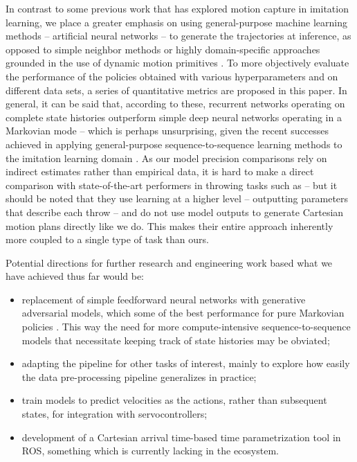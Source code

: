 \documentclass{article}
\begin{document}
In contrast to some previous work that has explored motion capture in imitation learning, we place a greater emphasis on using general-purpose machine learning methods -- artificial neural networks -- to generate the trajectories at inference, as opposed to simple neighbor methods \citep{jha2017imitation} or highly domain-specific approaches grounded in the use of dynamic motion primitives \citep{vuga2013mocap}. To more objectively evaluate the performance of the policies obtained with various hyperparameters and on different data sets, a series of quantitative metrics are proposed in this paper. In general, it can be said that, according to these, recurrent networks operating on complete state histories outperform simple deep neural networks operating in a Markovian mode -- which is perhaps unsurprising, given the recent successes achieved in applying general-purpose sequence-to-sequence learning methods to the imitation learning domain \citep{reed2022generalist}. As our model precision comparisons rely on indirect estimates rather than empirical data, it is hard to make a direct comparison with state-of-the-art performers in throwing tasks such as \citep{zeng2020tossingbot} -- but it should be noted that they use learning at a higher level -- outputting parameters that describe each throw -- and do not use model outputs to generate Cartesian motion plans directly like we do. This makes their entire approach inherently more coupled to a single type of task than ours.

Potential directions for further research and engineering work based what we have achieved thus far would be:
\begin{itemize}
	\item replacement of simple feedforward neural networks with generative adversarial models, which some of the best performance for pure Markovian policies \citep{ho2016generative}. This way the need for more compute-intensive sequence-to-sequence models that necessitate keeping track of state histories may be obviated;
	\item adapting the pipeline for other tasks of interest, mainly to explore how easily the data pre-processing pipeline generalizes in practice;
	\item train models to predict velocities as the actions, rather than subsequent states, for integration with servocontrollers;
	\item development of a Cartesian arrival time-based time parametrization tool in ROS, something which is currently lacking in the ecosystem.
\end{itemize}



\end{document}
